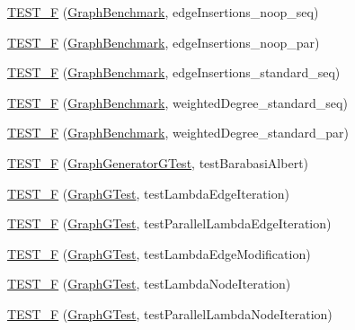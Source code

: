 \begin{DoxyCompactItemize}
\item 
\hyperlink{namespace_networ_kit_ab3677f34b5d4ea16d7d6cf26b1917959}{T\-E\-S\-T\-\_\-\-F} (\hyperlink{class_networ_kit_1_1_graph_benchmark}{Graph\-Benchmark}, edge\-Insertions\-\_\-noop\-\_\-seq)
\item 
\hyperlink{namespace_networ_kit_a63f18361fab3ad91fc3c71f32497050b}{T\-E\-S\-T\-\_\-\-F} (\hyperlink{class_networ_kit_1_1_graph_benchmark}{Graph\-Benchmark}, edge\-Insertions\-\_\-noop\-\_\-par)
\item 
\hyperlink{namespace_networ_kit_a8c65560bd7dca56d87f0f6fb4711e380}{T\-E\-S\-T\-\_\-\-F} (\hyperlink{class_networ_kit_1_1_graph_benchmark}{Graph\-Benchmark}, edge\-Insertions\-\_\-standard\-\_\-seq)
\item 
\hyperlink{namespace_networ_kit_a5beab62107ae9996356af00d2733cd7f}{T\-E\-S\-T\-\_\-\-F} (\hyperlink{class_networ_kit_1_1_graph_benchmark}{Graph\-Benchmark}, weighted\-Degree\-\_\-standard\-\_\-seq)
\item 
\hyperlink{namespace_networ_kit_a162ce69cd6c125c87e50ea0369f4cec8}{T\-E\-S\-T\-\_\-\-F} (\hyperlink{class_networ_kit_1_1_graph_benchmark}{Graph\-Benchmark}, weighted\-Degree\-\_\-standard\-\_\-par)
\item 
\hyperlink{namespace_networ_kit_a2e6dc85b94615593bec85ab0d961f7a5}{T\-E\-S\-T\-\_\-\-F} (\hyperlink{class_networ_kit_1_1_graph_generator_g_test}{Graph\-Generator\-G\-Test}, test\-Barabasi\-Albert)
\item 
\hyperlink{namespace_networ_kit_ad40252180bd36e0238b94f5576683951}{T\-E\-S\-T\-\_\-\-F} (\hyperlink{class_networ_kit_1_1_graph_g_test}{Graph\-G\-Test}, test\-Lambda\-Edge\-Iteration)
\item 
\hyperlink{namespace_networ_kit_a2ec052386a15b77a9da5452d6866aa60}{T\-E\-S\-T\-\_\-\-F} (\hyperlink{class_networ_kit_1_1_graph_g_test}{Graph\-G\-Test}, test\-Parallel\-Lambda\-Edge\-Iteration)
\item 
\hyperlink{namespace_networ_kit_ae1c2725eb57fbfe2f0d42512d453d70a}{T\-E\-S\-T\-\_\-\-F} (\hyperlink{class_networ_kit_1_1_graph_g_test}{Graph\-G\-Test}, test\-Lambda\-Edge\-Modification)
\item 
\hyperlink{namespace_networ_kit_aa5ae2d52c221f413c51b5432eb36a88f}{T\-E\-S\-T\-\_\-\-F} (\hyperlink{class_networ_kit_1_1_graph_g_test}{Graph\-G\-Test}, test\-Lambda\-Node\-Iteration)
\item 
\hyperlink{namespace_networ_kit_a1eced118aec8d8c268f8db89355e9b41}{T\-E\-S\-T\-\_\-\-F} (\hyperlink{class_networ_kit_1_1_graph_g_test}{Graph\-G\-Test}, test\-Parallel\-Lambda\-Node\-Iteration)

\end{DoxyCompactItemize}
